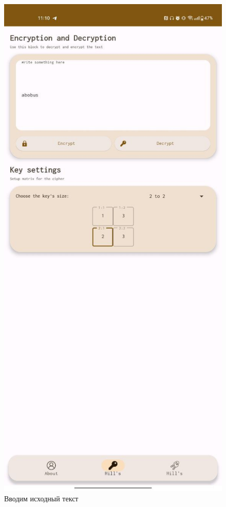 \documentclass[a4paper]{article}
\begin{document}
\begin{figure}[H]
\begin{minipage}{0.3\textwidth}
        \caption{Вводим исходный текст}
    \end{minipage}
    \hfill
    \begin{minipage}{0.3\textwidth}
        \centering
        \includegraphics[width=\textwidth]{02_0002}

\end{minipage}
\end{figure}
\end{document}
